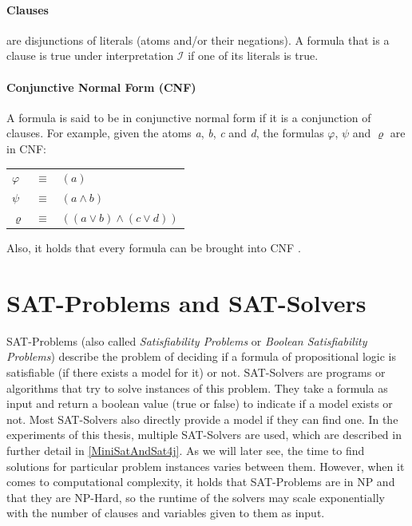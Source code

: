 \paragraph{Clauses}
are disjunctions of literals (atoms and/or their negations). A formula that is a clause is true under interpretation $\mathcal{I}$ if one of its literals is true.

\paragraph{Conjunctive Normal Form (CNF)}
A formula is said to be in conjunctive normal form if it is a conjunction of clauses. 
For example, given the atoms \emph{a}, \emph{b}, \emph{c} and \emph{d}, the formulas $\varphi$, $\psi$ and $\varrho$ are in CNF:
\begin{center}
    \begin{tabular}{ l l l }
    $\varphi$ & $\equiv$ & $(a)$\\
    $\psi$ & $\equiv$ & $(a \land b)$\\
    $\varrho$ & $\equiv$ & $((a \lor b) \land (c \lor d))$\\
\end{tabular}
\end{center}
Also, it holds that every formula can be brought into CNF \cite{LogicForComputerScientists}.

\section{SAT-Problems and SAT-Solvers}
SAT-Problems (also called \emph{Satisfiability Problems} or \emph{Boolean Satisfiability Problems}) describe the problem of deciding if a formula of propositional logic is satisfiable (if there exists a model for it) or not. SAT-Solvers are programs or algorithms that try to solve instances of this problem. They take a formula as input and return a boolean value (true or false) to indicate if a model exists or not. Most SAT-Solvers also directly provide a model if they can find one. In the experiments of this thesis, multiple SAT-Solvers are used, which are described in further detail in \ref{MiniSatAndSat4j}. As we will later see, the time to find solutions for particular problem instances varies between them. However, when it comes to computational complexity, it holds that SAT-Problems are in NP and that they are NP-Hard\cite{10.1145/800157.805047}\cite{levin1973universal}, so the runtime of the solvers may scale exponentially with the number of clauses and variables given to them as input.

